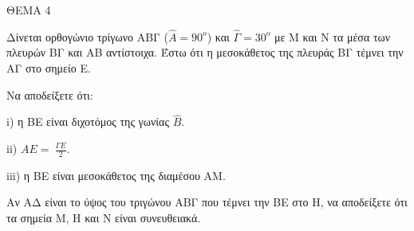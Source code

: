 
ΘΕΜΑ 4

Δίνεται ορθογώνιο τρίγωνο ΑΒΓ ($\widehat{Α} = 90^{ο}$) και $\widehat{\Gamma} = 30^{ο}$ με Μ και Ν τα μέσα των πλευρών ΒΓ και ΑΒ αντίστοιχα. Έστω ότι η μεσοκάθετος της πλευράς ΒΓ τέμνει την ΑΓ στο σημείο Ε.

\begin{alist}
\item Να αποδείξετε ότι:

i) η ΒΕ είναι διχοτόμος της γωνίας $\widehat{Β}$. 

ii) $ΑΕ = \ \frac{\Gamma Ε}{2}$. 

iii) η ΒΕ είναι μεσοκάθετος της διαμέσου ΑΜ. 

\item Αν ΑΔ είναι το ύψος του τριγώνου ΑΒΓ που τέμνει την ΒΕ στο Η, να αποδείξετε ότι τα σημεία Μ, Η και Ν είναι συνευθειακά. 


\end{alist}
